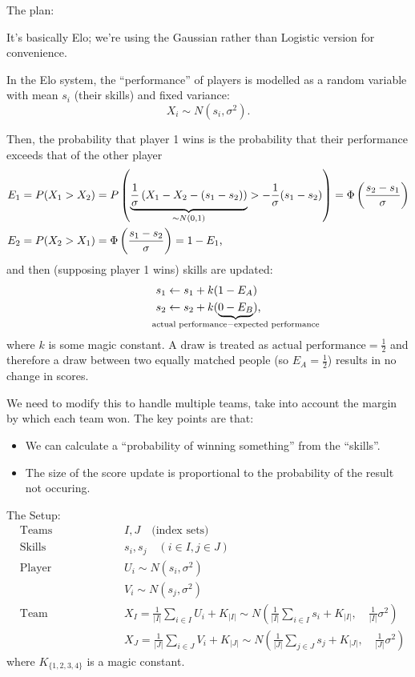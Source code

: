 \documentclass{article}
\begin{document}
The plan:

It's basically Elo; we're using the Gaussian rather than Logistic version for convenience.

In the Elo system, the ``performance'' of players is modelled as a random variable with mean $s_i$ (their skills) and fixed variance:
\[
    X_i \sim N(s_i, \sigma^2)
    \text{.}
\]

Then, the probability that player 1 wins is the probability that their performance exceeds that of the other player
\begin{align*}
    E_1 &= P(X_1 > X_2) = P \left( \underbrace{ \frac{1}{\sigma} \left( X_1 - X_2 - (s_1 - s_2) \right) }_{\mathclap{\sim N(0, 1)}}
                        > - \frac{1}{\sigma} (s_1 - s_2) \right)
         = \Phi\left( \frac{s_2 - s_1}{\sigma} \right) \\
    E_2 &= P(X_2 > X_1) = \Phi\left( \frac{s_1 - s_2}{\sigma} \right) = 1 - E_1
    \text{,}
\end{align*}
and then (supposing player 1 wins) skills are updated:
\begin{align*}
    s_1 &\leftarrow s_1 + k ( 1 - E_A ) \\
    s_2 &\leftarrow s_2 + k ( \underbrace{0 - E_B}_{\mathclap{\text{actual performance} - \text{expected performance}}} )
    \text{,}
\end{align*}
where $k$ is some magic constant. A draw is treated as $\text{actual performance} = \frac{1}{2}$ and therefore a draw between two equally matched people (so $E_A = \frac{1}{2}$) results in no change in scores.

We need to modify this to handle multiple teams, take into account the margin by which each team won. The key points are that:
\begin{itemize}
    \item We can calculate a ``probability of winning something'' from the ``skills''.
    \item The size of the score update is proportional to the probability of the result not occuring.
\end{itemize}

The Setup:
\begin{align*}
    &\text{Teams } && I, J \quad\text{(index sets)} \\
    &\text{Skills } && s_i, s_j \quad (i \in I, j \in J) \\
    &\text{Player performance } && U_i \sim N(s_i, \sigma^2) \\
    &                           && V_i \sim N(s_j, \sigma^2) \\
    &\text{Team performance } && X_I = \frac{1}{|I|} \sum_{i \in I} U_i + K_{|I|} \sim N\left( \frac{1}{|I|} \sum_{i \in I} s_i + K_{|I|}, \quad \frac{1}{|I|} \sigma^2 \right) \\
    &                         && X_J = \frac{1}{|J|} \sum_{i \in J} V_i + K_{|J|} \sim N\left( \frac{1}{|J|} \sum_{j \in J} s_j + K_{|J|}, \quad  \frac{1}{|J|} \sigma^2 \right)
\end{align*}
where $K_{\{1,2,3,4\}}$ is a magic constant.
\end{document}
